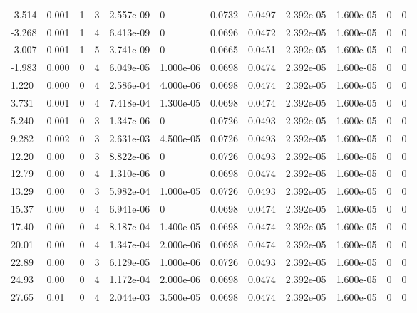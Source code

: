 \documentclass[preview]{standalone}
\begin{document}
{{\begin{tabular}{L{1.2cm}C{1.2cm} C{0.3cm}C{0.5cm} C{1.4cm}C{1.4cm} C{1.4cm}C{1.4cm} C{1.6cm}C{1.6cm} C{1.6cm}C{1.6cm}}
  -3.514  &  0.001  & 1     &  3 &  2.557e-09  & 0  &  0.0732&   0.0497& 2.392e-05 & 1.600e-05   &  0 & 0  \\ 
  -3.268  &  0.001  & 1     &  4 &  6.413e-09  & 0  &  0.0696&   0.0472& 2.392e-05 & 1.600e-05   &  0 & 0  \\ 
  -3.007  &  0.001  & 1     &  5 &  3.741e-09  & 0  &  0.0665&   0.0451& 2.392e-05 & 1.600e-05   &  0 & 0  \\ 
  -1.983  &  0.000  & 0     &  4 &  6.049e-05  & 1.000e-06  &  0.0698&   0.0474& 2.392e-05 & 1.600e-05   &  0 & 0  \\ 
  1.220  &  0.000  & 0     &  4 &  2.586e-04  & 4.000e-06  &  0.0698&   0.0474& 2.392e-05 & 1.600e-05   &  0 & 0  \\ 
  3.731  &  0.001  & 0     &  4 &  7.418e-04  & 1.300e-05  &  0.0698&   0.0474& 2.392e-05 & 1.600e-05   &  0 & 0  \\ 
  5.240  &  0.001  & 0     &  3 &  1.347e-06  & 0  &  0.0726&   0.0493& 2.392e-05 & 1.600e-05   &  0 & 0  \\ 
  9.282  &  0.002  & 0     &  3 &  2.631e-03  & 4.500e-05  &  0.0726&   0.0493& 2.392e-05 & 1.600e-05   &  0 & 0  \\ 
  12.20  &  0.00  & 0     &  3 &  8.822e-06  & 0  &  0.0726&   0.0493& 2.392e-05 & 1.600e-05   &  0 & 0  \\ 
  12.79  &  0.00  & 0     &  4 &  1.310e-06  & 0  &  0.0698&   0.0474& 2.392e-05 & 1.600e-05   &  0 & 0  \\ 
  13.29  &  0.00  & 0     &  3 &  5.982e-04  & 1.000e-05  &  0.0726&   0.0493& 2.392e-05 & 1.600e-05   &  0 & 0  \\ 
  15.37  &  0.00  & 0     &  4 &  6.941e-06  & 0  &  0.0698&   0.0474& 2.392e-05 & 1.600e-05   &  0 & 0  \\ 
  17.40  &  0.00  & 0     &  4 &  8.187e-04  & 1.400e-05  &  0.0698&   0.0474& 2.392e-05 & 1.600e-05   &  0 & 0  \\ 
  20.01  &  0.00  & 0     &  4 &  1.347e-04  & 2.000e-06  &  0.0698&   0.0474& 2.392e-05 & 1.600e-05   &  0 & 0  \\ 
  22.89  &  0.00  & 0     &  3 &  6.129e-05  & 1.000e-06  &  0.0726&   0.0493& 2.392e-05 & 1.600e-05   &  0 & 0  \\ 
  24.93  &  0.00  & 0     &  4 &  1.172e-04  & 2.000e-06  &  0.0698&   0.0474& 2.392e-05 & 1.600e-05   &  0 & 0  \\ 
  27.65  &  0.01  & 0     &  4 &  2.044e-03  & 3.500e-05  &  0.0698&   0.0474& 2.392e-05 & 1.600e-05   &  0 & 0  \\ 

\end{tabular}}}
\end{document}
